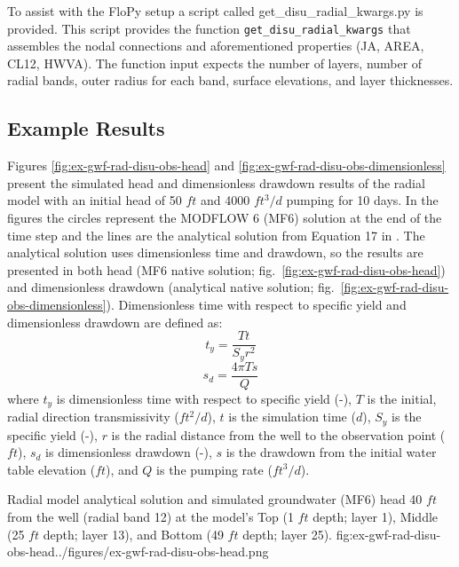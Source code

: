 To assist with the FloPy setup a script called get\_disu\_radial\_kwargs.py is provided. This script provides the function \texttt{get\_disu\_radial\_kwargs} that assembles the nodal connections and aforementioned properties (JA, AREA, CL12, HWVA). The function input expects the number of layers, number of radial bands, outer radius for each band, surface elevations, and layer thicknesses. 


\subsection{Example Results}

Figures \ref{fig:ex-gwf-rad-disu-obs-head} and \ref{fig:ex-gwf-rad-disu-obs-dimensionless} present the simulated head and dimensionless drawdown results of the radial model with an initial head of 50 $ft$ and 4000 $ft^3/d$ pumping for 10 days. In the figures the circles represent the MODFLOW 6 (MF6) solution at the end of the time step and the lines are the analytical solution from Equation 17 in \cite{neuman1974effect}. The analytical solution uses dimensionless time and drawdown, so the results are presented in both head (MF6 native solution; fig.~\ref{fig:ex-gwf-rad-disu-obs-head}) and dimensionless drawdown (analytical native solution; fig.~\ref{fig:ex-gwf-rad-disu-obs-dimensionless}). Dimensionless time with respect to specific yield and dimensionless drawdown are defined as:
%
\begin{equation}
   t_y = \frac{Tt}{S_yr^2}
   \label{eq:dimensionless_time}
\end{equation}
%
\begin{equation}
   s_d = \frac{4\pi Ts}{Q}
   \label{eq:dimensionless_drawdown}
\end{equation}
%
where $t_y$ is dimensionless time with respect to specific yield (-), $T$ is the initial, radial direction transmissivity ($ft^2/d$), $t$ is the simulation time ($d$), $S_y$ is the specific yield (-), $r$ is the radial distance from the well to the observation point ($ft$), $s_d$ is dimensionless drawdown (-), $s$ is the drawdown from the initial water table elevation ($ft$), and $Q$ is the pumping rate ($ft^3/d$).

\begin{StandardFigure}{
                                     Radial model analytical solution \citep{neuman1974effect} and simulated groundwater (MF6) head 40 $ft$ from the well (radial band 12)
                                     at the model’s Top (1 $ft$ depth; layer 1), Middle (25 $ft$ depth; layer 13), and Bottom (49 $ft$ depth; layer 25).
                                     }{fig:ex-gwf-rad-disu-obs-head}{../figures/ex-gwf-rad-disu-obs-head.png}
\end{StandardFigure}                                 


